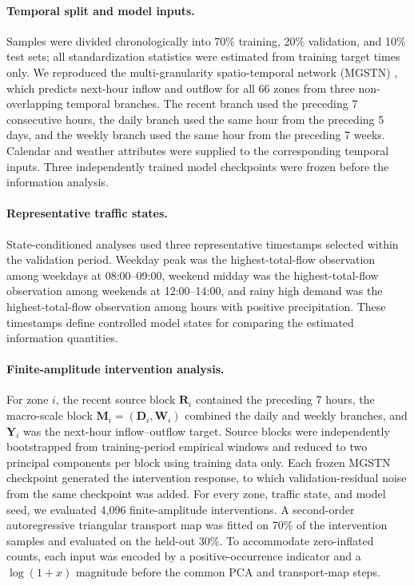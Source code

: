 \documentclass[fleqn,10pt]{wlscirep}
\begin{document}
\paragraph{Temporal split and model inputs.}
Samples were divided chronologically into 70\% training, 20\% validation, and 10\% test sets; all standardization statistics were estimated from training target times only. We reproduced the multi-granularity spatio-temporal network (MGSTN) \cite{Shi2026MGSTN}, which predicts next-hour inflow and outflow for all 66 zones from three non-overlapping temporal branches. The recent branch used the preceding 7 consecutive hours, the daily branch used the same hour from the preceding 5 days, and the weekly branch used the same hour from the preceding 7 weeks. Calendar and weather attributes were supplied to the corresponding temporal inputs. Three independently trained model checkpoints were frozen before the information analysis.

\paragraph{Representative traffic states.}
State-conditioned analyses used three representative timestamps selected within the validation period. Weekday peak was the highest-total-flow observation among weekdays at 08:00--09:00, weekend midday was the highest-total-flow observation among weekends at 12:00--14:00, and rainy high demand was the highest-total-flow observation among hours with positive precipitation. These timestamps define controlled model states for comparing the estimated information quantities.

\paragraph{Finite-amplitude intervention analysis.}
For zone \(i\), the recent source block \(\mathbf{R}_i\) contained the preceding 7 hours, the macro-scale block \(\mathbf{M}_i=(\mathbf{D}_i,\mathbf{W}_i)\) combined the daily and weekly branches, and \(\mathbf{Y}_i\) was the next-hour inflow--outflow target. Source blocks were independently bootstrapped from training-period empirical windows and reduced to two principal components per block using training data only. Each frozen MGSTN checkpoint generated the intervention response, to which validation-residual noise from the same checkpoint was added. For every zone, traffic state, and model seed, we evaluated 4,096 finite-amplitude interventions. A second-order autoregressive triangular transport map was fitted on 70\% of the intervention samples and evaluated on the held-out 30\%. To accommodate zero-inflated counts, each input was encoded by a positive-occurrence indicator and a \(\log(1+x)\) magnitude before the common PCA and transport-map steps.



\end{document}
